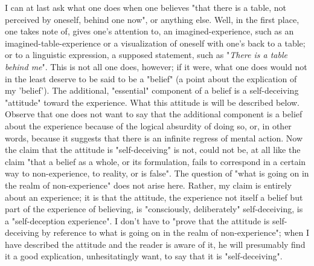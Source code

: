 \documentclass[10pt,twoside,draft]{memoir}
\newcommand{\lexpression}[1]{"\emph{#1}"}
\begin{document}
{I can at last ask what one does when one believes "that there is a table, 
not perceived by oneself, behind one now", or anything else. Well, in the 
first place, one takes note of, gives one's attention to, an 
imagined-experience, such as an imagined-table-experience or a visualization 
of oneself with one's back to a table; or to a linguistic expression, a supposed 
statement, such as \lexpression{There is a table behind me}. This is not all one does, 
however; if it were, what one does would not in the least deserve to be said 
to be a "belief" (a point about the explication of my 'belief'). The 
additional, "essential" component of a belief is a self-deceiving "attitude" 
toward the experience. What this attitude is will be described below. Observe 
that one does not want to say that the additional component is a belief 
about the experience because of the logical absurdity of doing so, or, in 
other words, because it suggests that there is an infinite regress of mental 
action. Now the claim that the attitude is "self-deceiving" is not, could not 
be, at all like the claim "that a belief as a whole, or its formulation, fails to 
correspond in a certain way to non-experience, to reality, or is false". The 
question of "what is going on in the realm of non-experience" does not arise 
here. Rather, my claim is entirely about an experience; it is that the attitude, 
the experience not itself a belief but part of the experience of believing, is 
"consciously, deliberately" self-deceiving, is a "self-deception experience". I 
don't have to "prove that the attitude is self-deceiving by reference to what 
is going on in the realm of non-experience"; when I have described the 
attitude and the reader is aware of it, he will presumably find it a good 
explication, unhesitatingly want, to say that it is "self-deceiving". 

}
\end{document}
